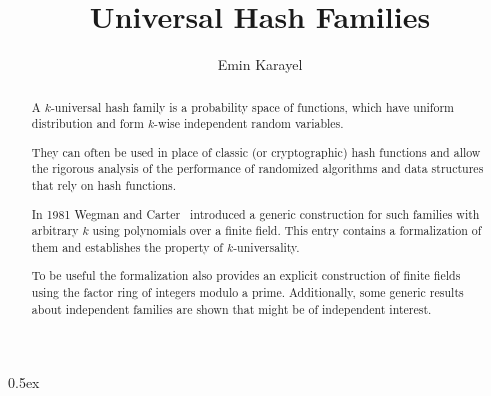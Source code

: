 \documentclass[11pt,a4paper]{article}
\begin{document}
\title{Universal Hash Families}
\author{Emin Karayel}
\maketitle

\begin{abstract}
A $k$-universal hash family is a probability space of functions, which have uniform distribution and
form $k$-wise independent random variables.

They can often be used in place of classic (or cryptographic) hash functions and allow the 
rigorous analysis of the performance of randomized algorithms and data structures that
rely on hash functions.

In 1981 Wegman and Carter~\cite{wegman1981} introduced a generic construction for such
families with arbitrary $k$ using polynomials over a finite field. This entry contains a formalization
of them and establishes the property of $k$-universality.

To be useful the formalization also provides an explicit construction of finite fields using the
factor ring of integers modulo a prime. Additionally, some generic results about independent
families are shown that might be of independent interest.
\end{abstract}

\parindent 0pt\parskip 0.5ex





\end{document}
